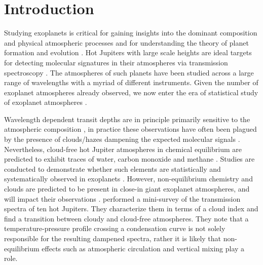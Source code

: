 \section{Introduction}

\label{P1:sec:introduction}


Studying exoplanets is critical for gaining insights into the dominant composition and physical atmospheric processes and for understanding the theory of planet formation and evolution \citep{Seager2010, Crossfield2015, Deming2017}. Hot Jupiters with large scale heights are ideal targets for detecting molecular signatures in their atmospheres via transmission spectroscopy \citep{Seager2000a, Brown2001}. The atmospheres of such planets have been studied across a large range of wavelengths with a myriad of different instruments. Given the number of exoplanet atmospheres already observed, we now enter the era of statistical study of exoplanet atmospheres \citep[e.g.,][]{Triaud2014c, Beatty2014, Gao2020, Keating2019, Garhart2020, Baxter2020, Fu2017, Tsiaras2018, Wallack2019}.

Wavelength dependent transit depths are in principle primarily sensitive to the atmospheric composition \citep{Seager2000a}, in practice these observations have often been plagued by the presence of clouds/hazes dampening the expected molecular signals \citep[e.g.,][]{Fortney2005, Sing2016, Barstow2017}. Nevertheless, cloud-free hot Jupiter atmospheres in chemical equilibrium are predicted to exhibit traces of water, carbon monoxide and methane \citep{Seager2000b, Fortney2005, Fortney2010}. Studies are conducted to demonstrate whether such elements are statistically and systematically observed in exoplanets \citep{Tsai2018}. However, non-equilibrium chemistry and clouds are predicted to be present in close-in giant exoplanet atmospheres, and will impact their observations \citep[e.g.,][]{Agundez2012, Drummond2016, Steinrueck2019}. \citet{Sing2016} performed a mini-survey of the transmission spectra of ten hot Jupiters. They characterize them in terms of a cloud index and find a transition between cloudy and cloud-free atmospheres. They note that a temperature-pressure profile crossing a condensation curve is not solely responsible for the resulting dampened spectra, rather it is likely that non-equilibrium effects such as atmospheric circulation and vertical mixing play a role.

